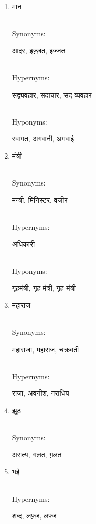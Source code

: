 \documentclass{article}
\begin{document}
\begin{enumerate}
\item \begin{hindi}मान\end{hindi} \\
Synonyms: \begin{hindi}आदर, इज़्ज़त, इज्जत\end{hindi} \\
Hypernyms: \begin{hindi}सद्व्यवहार, सदाचार, सद् व्यवहार\end{hindi} \\
Hyponyms: \begin{hindi}स्वागत, अगवानी, अगवाई\end{hindi}

\item \begin{hindi}मंत्री\end{hindi} \\
Synonyms: \begin{hindi}मन्त्री, मिनिस्टर, वजीर\end{hindi} \\
Hypernyms: \begin{hindi}अधिकारी\end{hindi} \\
Hyponyms: \begin{hindi}गृहमंत्री, गृह-मंत्री, गृह मंत्री\end{hindi}

\item \begin{hindi}महाराज\end{hindi} \\
Synonyms: \begin{hindi}महाराजा, महाराज, चक्रवर्ती\end{hindi} \\
Hypernyms: \begin{hindi}राजा, अवनीश, नराधिप\end{hindi}

\item \begin{hindi}झूठ\end{hindi} \\
Synonyms: \begin{hindi}असत्य, गलत, ग़लत\end{hindi}

\item \begin{hindi}भई\end{hindi} \\
Hypernyms: \begin{hindi}शब्द, लफ़्ज़, लफ्ज\end{hindi}


\end{enumerate}
\end{document}
